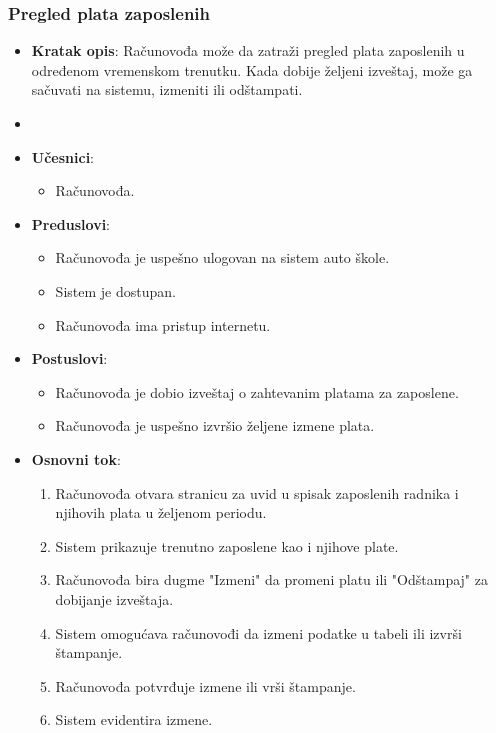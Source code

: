 \subsubsection{Pregled plata zaposlenih}
\label{subsubsec:vozni park}
\begin{itemize}
  \item \textbf{Kratak opis}: Računovođa može da zatraži pregled plata zaposlenih u određenom vremenskom trenutku. Kada dobije željeni izveštaj, 
  može ga sačuvati na sistemu, izmeniti ili odštampati.

  \item 
  \item \textbf{Učesnici}:
    \begin{itemize}
    \item Računovođa.
    \end{itemize}
  \item \textbf{Preduslovi}:
    \begin{itemize}
    \item  Računovođa je uspešno ulogovan na sistem auto škole.
    \item  Sistem je dostupan.
    \item  Računovođa ima pristup internetu.
    \end{itemize}
  \item \textbf{Postuslovi}:
      \begin{itemize}
      \item  Računovođa je dobio izveštaj o zahtevanim platama za zaposlene.
      \item  Računovođa je uspešno izvršio željene izmene plata.
      \end{itemize}
  \item \textbf{Osnovni tok}:
      \begin{enumerate}
        \item Računovođa otvara stranicu za uvid u spisak zaposlenih radnika i njihovih plata u željenom periodu.
        \item Sistem prikazuje trenutno zaposlene kao i njihove plate.
        \item Računovođa bira dugme "Izmeni" da promeni platu ili  "Odštampaj" za dobijanje izveštaja.
        \item Sistem omogućava računovođi da izmeni podatke u tabeli  ili  izvrši štampanje.
        \item Računovođa potvrđuje izmene ili vrši štampanje.
        \item Sistem evidentira izmene.
      \end{enumerate}


\end{itemize}
